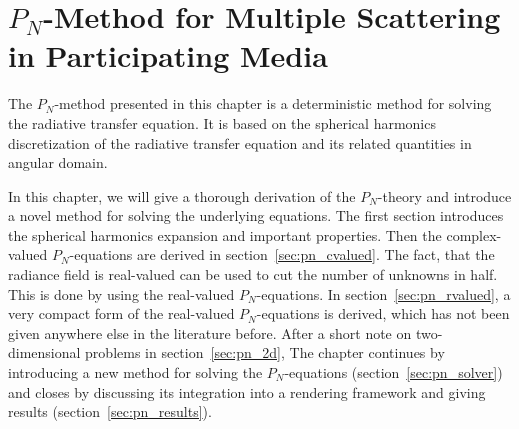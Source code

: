 \chapter{$P_N$-Method for Multiple Scattering in Participating Media}
%
\label{sec:pnmethod}

The $P_N$-method presented in this chapter is a deterministic method for solving the radiative transfer equation. It is based on the spherical harmonics discretization of the radiative transfer equation and its related quantities in angular domain. 

In this chapter, we will give a thorough derivation of the $P_N$-theory and introduce a novel method for solving the underlying equations. The first section introduces the spherical harmonics expansion and important properties. Then the complex-valued $P_N$-equations are derived in section~\ref{sec:pn_cvalued}. The fact, that the radiance field is real-valued can be used to cut the number of unknowns in half. This is done by using the real-valued $P_N$-equations. In section~\ref{sec:pn_rvalued}, a very compact form of the real-valued $P_N$-equations is derived, which has not been given anywhere else in the literature before. After a short note on two-dimensional problems in section~\ref{sec:pn_2d}, The chapter continues by introducing a new method for solving the $P_N$-equations (section~\ref{sec:pn_solver}) and closes by discussing its integration into a rendering framework and giving results (section~\ref{sec:pn_results}).









